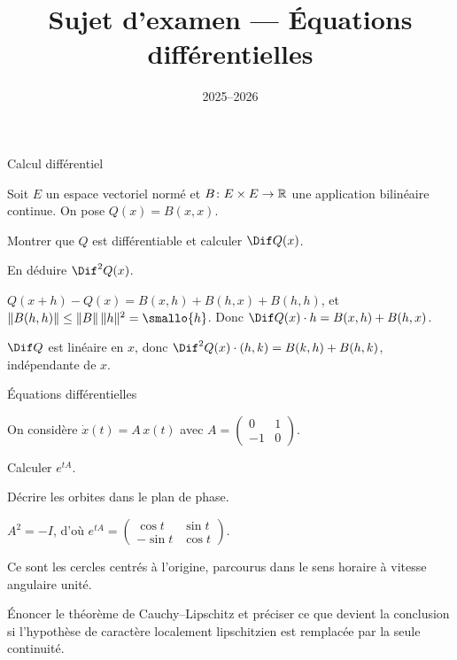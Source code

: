 \documentclass[11pt]{ocots-exam}
\title{Sujet d'examen --- Équations différentielles}
\date{2025--2026}
\begin{document}
\maketitle

\medskip
\begin{docpart}
    Calcul différentiel
\end{docpart}

\begin{exercise}[points=4]
    Soit $E$ un espace vectoriel normé et $B \colon E \times E \to \mathbb{R}$ une
    application bilinéaire continue. On pose $Q(x) = B(x,x)$.
    \begin{question}
        Montrer que $Q$ est différentiable et calculer $\Dif Q(x)$.
    \end{question}
    \begin{question}
        En déduire $\Dif^2 Q(x)$.
    \end{question}
\solution
    \begin{question}
        $Q(x+h) - Q(x) = B(x,h) + B(h,x) + B(h,h)$, et
        $\norm{B(h,h)} \le \norm{B}\, \norm{h}^2 = \smallo{h}$. Donc
        $\Dif Q(x) \cdot h = B(x,h) + B(h,x)$.
    \end{question}
    \begin{question}
        $\Dif Q$ est linéaire en $x$, donc
        $\Dif^2 Q(x)\cdot(h,k) = B(k,h) + B(h,k)$, indépendante de $x$.
    \end{question}
\end{exercise}

\begin{docpart}
    Équations différentielles
\end{docpart}

\begin{exercise}[points=6]
    On considère $\dot{x}(t) = A\, x(t)$ avec
    $A = \begin{pmatrix} 0 & 1 \\ -1 & 0 \end{pmatrix}$.
    \begin{question}
        Calculer $e^{tA}$.
    \end{question}
    \begin{question}
        Décrire les orbites dans le plan de phase.
    \end{question}
\solution
    \begin{question}
        $A^2 = -I$, d'où
        $e^{tA} = \begin{pmatrix} \cos t & \sin t \\ -\sin t & \cos t\end{pmatrix}$.
    \end{question}
    \begin{question}
        Ce sont les cercles centrés à l'origine, parcourus dans le sens
        horaire à vitesse angulaire unité.
    \end{question}
\end{exercise}

\begin{exercise}[points=4, nosolution]
    Énoncer le théorème de Cauchy--Lipschitz et préciser ce que devient la
    conclusion si l'hypothèse de caractère localement lipschitzien est
    remplacée par la seule continuité.
\end{exercise}
\end{document}
